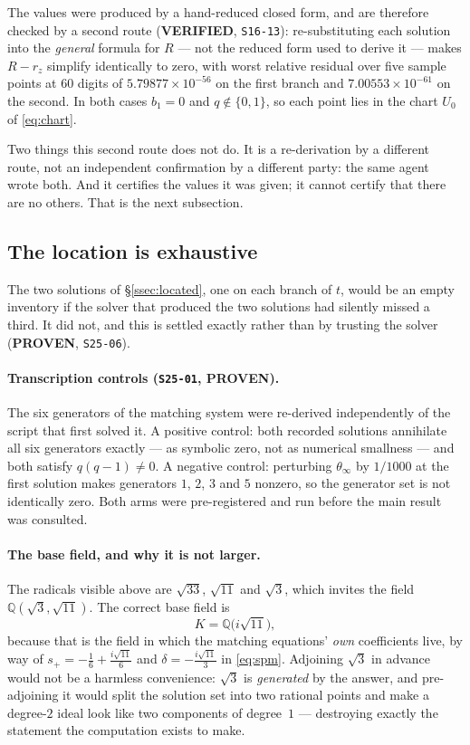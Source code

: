 The values were produced by a hand-reduced closed form, and are therefore
checked by a second route (\textbf{VERIFIED}, \texttt{S16-13}): re-substituting
each solution into the \emph{general} formula for $R$ --- not the reduced form
used to derive it --- makes $R-r_z$ simplify identically to zero, with worst
relative residual over five sample points at $60$ digits of
$5.79877\times10^{-56}$ on the first branch and $7.00553\times10^{-61}$ on the
second. In both cases $b_1=0$ and $q\notin\{0,1\}$, so each point lies in the
chart $U_0$ of \eqref{eq:chart}.

Two things this second route does not do. It is a re-derivation by a different
route, not an independent confirmation by a different party: the same agent
wrote both. And it certifies the values it was given; it cannot certify that
there are no others. That is the next subsection.

\subsection{The location is exhaustive}\label{ssec:exhaustive}

The two solutions of \S\ref{ssec:located}, one on each branch of $t$, would be
an empty inventory if
the solver that produced the two solutions had silently missed a third. It did
not, and this is settled exactly rather than by trusting the solver
(\textbf{PROVEN}, \texttt{S25-06}).

\paragraph{Transcription controls (\texttt{S25-01}, \textbf{PROVEN}).}
The six generators of the matching system were re-derived independently of the
script that first solved it. A positive control: both recorded solutions
annihilate all six generators exactly --- as symbolic zero, not as numerical
smallness --- and both satisfy $q(q-1)\neq0$. A negative control: perturbing
$\theta_\infty$ by $1/1000$ at the first solution makes generators $1$, $2$,
$3$ and $5$ nonzero, so the generator set is not identically zero. Both arms
were pre-registered and run before the main result was consulted.

\paragraph{The base field, and why it is not larger.}
The radicals visible above are $\sqrt{33}$, $\sqrt{11}$ and $\sqrt3$, which
invites the field $\mathbb Q(\sqrt3,\sqrt{11})$. The correct base field is
\[
  K=\mathbb Q\bigl(i\sqrt{11}\bigr),
\]
because that is the field in which the matching equations' \emph{own}
coefficients live, by way of $s_+=-\tfrac16+\tfrac{i\sqrt{11}}{6}$ and
$\delta=-\tfrac{i\sqrt{11}}{3}$ in \eqref{eq:spm}. Adjoining $\sqrt3$ in
advance would not be a harmless convenience: $\sqrt3$ is \emph{generated} by
the answer, and pre-adjoining it would split the solution set into two
rational points and make a degree-$2$ ideal look like two components of
degree~$1$ --- destroying exactly the statement the computation exists to make.

